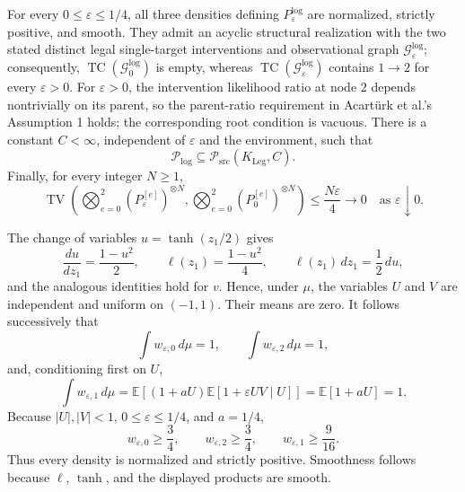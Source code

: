 For every \(0\le\varepsilon\le1/4\), all three densities defining \(P_{\varepsilon}^{\mathrm{log}}\) are normalized, strictly positive, and smooth.  They admit an acyclic structural realization with the two stated distinct legal single-target interventions and observational graph \(\mathcal G_{\varepsilon}^{\mathrm{log}}\); consequently, \(\operatorname{TC}(\mathcal G_{0}^{\mathrm{log}})\) is empty, whereas \(\operatorname{TC}(\mathcal G_{\varepsilon}^{\mathrm{log}})\) contains \(1\to2\) for every \(\varepsilon>0\).  For \(\varepsilon>0\), the intervention likelihood ratio at node \(2\) depends nontrivially on its parent, so the parent-ratio requirement in Acartürk et al.'s Assumption 1 holds; the corresponding root condition is vacuous.  There is a constant \(C<\infty\), independent of \(\varepsilon\) and the environment, such that
\[
 \mathcal P_{\mathrm{log}}\subseteq
 \mathcal P_{\mathrm{src}}(K_{\mathrm{Leg}},C).
\]
Finally, for every integer \(N\ge1\),
\[
 \operatorname{TV}\!\left(
   \bigotimes_{e=0}^2(P_{\varepsilon}^{[e]})^{\otimes N},
   \bigotimes_{e=0}^2(P_{0}^{[e]})^{\otimes N}
 \right)
 \le \frac{N\varepsilon}{4}\longrightarrow0
 \quad\text{as }\varepsilon\downarrow0.
\]

The change of variables \(u=\tanh(z_1/2)\) gives
\[
 \frac{du}{dz_1}=\frac{1-u^2}{2},
 \qquad
 \ell(z_1)=\frac{1-u^2}{4},
 \qquad
 \ell(z_1)\,dz_1=\frac12\,du,
\]
and the analogous identities hold for \(v\).  Hence, under \(\mu\), the variables \(U\) and \(V\) are independent and uniform on \((-1,1)\).  Their means are zero.  It follows successively that
\[
 \int w_{\varepsilon,0}\,d\mu=1,
 \qquad
 \int w_{\varepsilon,2}\,d\mu=1,
\]
and, conditioning first on \(U\),
\[
 \int w_{\varepsilon,1}\,d\mu
 =\mathbb E\!\left[(1+aU)\mathbb E[1+\varepsilon UV\mid U]\right]
 =\mathbb E[1+aU]=1.
\]
Because \(|U|,|V|<1\), \(0\le\varepsilon\le1/4\), and \(a=1/4\),
\[
 w_{\varepsilon,0}\ge\frac34,
 \qquad
 w_{\varepsilon,2}\ge\frac34,
 \qquad
 w_{\varepsilon,1}\ge\frac9{16}.
\]
Thus every density is normalized and strictly positive.  Smoothness follows because \(\ell\), \(\tanh\), and the displayed products are smooth.


